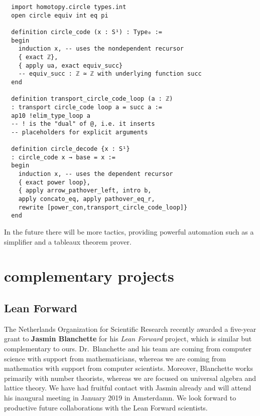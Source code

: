 \documentclass[12pt]{amsart}  %
\begin{document}
\begin{enumerate}
\begin{lstlisting}
  import homotopy.circle types.int
  open circle equiv int eq pi
  
  definition circle_code (x : S¹) : Type₀ :=
  begin
    induction x, -- uses the nondependent recursor
    { exact ℤ},
    { apply ua, exact equiv_succ}
    -- equiv_succ : ℤ ≃ ℤ with underlying function succ
  end
  
  definition transport_circle_code_loop (a : ℤ)
  : transport circle_code loop a = succ a :=
  ap10 !elim_type_loop a
  -- ! is the "dual" of @, i.e. it inserts
  -- placeholders for explicit arguments
  
  definition circle_decode {x : S¹}
  : circle_code x → base = x :=
  begin
    induction x, -- uses the dependent recursor
    { exact power loop},
    { apply arrow_pathover_left, intro b,
    apply concato_eq, apply pathover_eq_r,
    rewrite [power_con,transport_circle_code_loop]}
  end
\end{lstlisting}

In the future there will be more tactics, providing powerful automation such as a simplifier and a tableaux theorem prover.
\end{enumerate}
\fi












\section{complementary projects}

\subsection{Lean Forward}
The Netherlands Organization for Scientific Research recently awarded 
a five-year grant 
to {\bf Jasmin Blanchette} for his \emph{Lean Forward} project, which is 
similar but complementary to ours. 
Dr.~Blanchette and his team are coming from computer science with support from mathematicians,
whereas we are coming from mathematics with support from computer scientists.  
Moreover, Blanchette works primarily with number theorists, whereas we are focused on 
universal algebra and lattice theory. We have had fruitful contact with Jasmin already 
and will attend his inaugural meeting in January 2019 in Amsterdamn.  
We look forward to productive future collaborations with the Lean Forward scientists.
\end{document}
